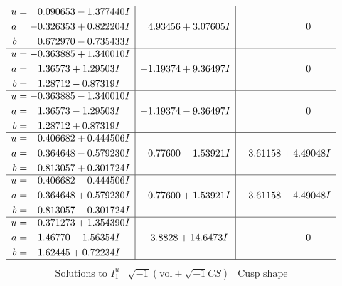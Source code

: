 \documentclass[1p]{elsarticle_modified}
\theoremstyle{definition}
\newcommand{\I}{\sqrt{-1}}
\begin{document}
$$\begin{array}{c|c|c}
\begin{aligned}
u &= \phantom{-}0.090653 - 1.377440 I \\
a &= -0.326353 + 0.822204 I \\
b &= \phantom{-}0.672970 - 0.735433 I\end{aligned}
 & \phantom{-}4.93456 + 3.07605 I & \phantom{-0.000000 } 0 \\ \hline\begin{aligned}
u &= -0.363885 + 1.340010 I \\
a &= \phantom{-}1.36573 + 1.29503 I \\
b &= \phantom{-}1.28712 - 0.87319 I\end{aligned}
 & -1.19374 + 9.36497 I & \phantom{-0.000000 } 0 \\ \hline\begin{aligned}
u &= -0.363885 - 1.340010 I \\
a &= \phantom{-}1.36573 - 1.29503 I \\
b &= \phantom{-}1.28712 + 0.87319 I\end{aligned}
 & -1.19374 - 9.36497 I & \phantom{-0.000000 } 0 \\ \hline\begin{aligned}
u &= \phantom{-}0.406682 + 0.444506 I \\
a &= \phantom{-}0.364648 - 0.579230 I \\
b &= \phantom{-}0.813057 + 0.301724 I\end{aligned}
 & -0.77600 - 1.53921 I & -3.61158 + 4.49048 I \\ \hline\begin{aligned}
u &= \phantom{-}0.406682 - 0.444506 I \\
a &= \phantom{-}0.364648 + 0.579230 I \\
b &= \phantom{-}0.813057 - 0.301724 I\end{aligned}
 & -0.77600 + 1.53921 I & -3.61158 - 4.49048 I \\ \hline\begin{aligned}
u &= -0.371273 + 1.354390 I \\
a &= -1.46770 - 1.56354 I \\
b &= -1.62445 + 0.72234 I\end{aligned}
 & -3.8828 + 14.6473 I & \phantom{-0.000000 } 0\\
 \hline 
 \end{array}$$\newpage$$\begin{array}{c|c|c}  
\text{Solutions to }I^u_{1}& \I (\text{vol} + \sqrt{-1}CS) & \text{Cusp shape}\\
 \hline 
\begin{aligned}

\end{aligned}
\end{array}$$
\end{document}
